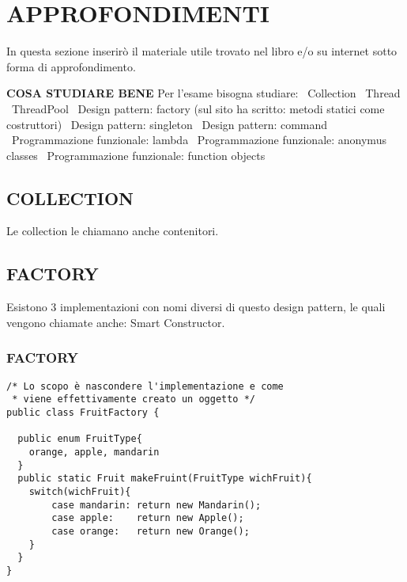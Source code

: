 

\newpage
\section{APPROFONDIMENTI}
In questa sezione inserirò il materiale utile trovato nel libro e/o su internet sotto forma di approfondimento. 


\noindent \textbf{COSA STUDIARE BENE} \newline
Per l'esame bisogna studiare: \newline
\textbullet\ Collection \newline
\textbullet\ Thread \newline
\textbullet\ ThreadPool \newline
\textbullet\ Design pattern: factory (sul sito ha scritto: metodi statici come costruttori)\newline
\textbullet\ Design pattern: singleton \newline
\textbullet\ Design pattern: command \newline
\textbullet\ Programmazione funzionale: lambda \newline
\textbullet\ Programmazione funzionale: anonymus classes \newline
\textbullet\ Programmazione funzionale: function objects \newline


\subsection{COLLECTION}
\noindent Le collection le chiamano anche contenitori.


\subsection{FACTORY}
Esistono 3 implementazioni con nomi diversi di questo design pattern, le quali vengono chiamate anche: Smart Constructor. \newline
\subsubsection{FACTORY}
\begin{lstlisting}
/* Lo scopo è nascondere l'implementazione e come
 * viene effettivamente creato un oggetto */
public class FruitFactory {

  public enum FruitType{
  	orange, apple, mandarin
  }
  public static Fruit makeFruint(FruitType wichFruit){
  	switch(wichFruit){
  		case mandarin: return new Mandarin();
  		case apple:    return new Apple();
  		case orange:   return new Orange();
  	}
  }
}
\end{lstlisting}
